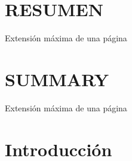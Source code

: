 \documentclass[spanish,12pt, a4paper,twoside]{paper}
\let\oldsection\section
\def\section{\cleardoublepage\oldsection}
\newcommand\blankpage{%
    \null
    \thispagestyle{empty}%
    \addtocounter{page}{-1}%
    \newpage}
\begin{document}
\afterpage{\blankpage}

\section*{RESUMEN}
Extensión máxima de una página


\section*{SUMMARY}
Extensión máxima de una página


\tableofcontents %



\listoffigures
\listoftables



\newpage
{} 

\section{Introducción}\label{sec:introduccion}
\end{document}
